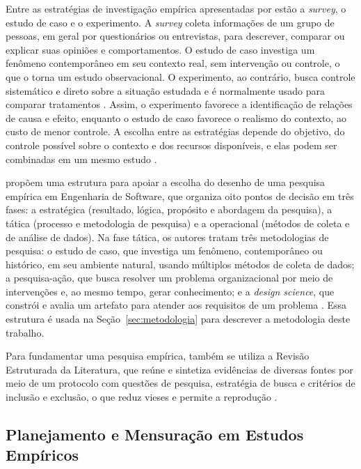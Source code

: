 Entre as estratégias de investigação empírica apresentadas por  estão a \textit{survey}, o estudo de caso e o experimento. A \textit{survey} coleta informações de um grupo de pessoas, em geral por questionários ou entrevistas, para descrever, comparar ou explicar suas opiniões e comportamentos. O estudo de caso investiga um fenômeno contemporâneo em seu contexto real, sem intervenção ou controle, o que o torna um estudo observacional. O experimento, ao contrário, busca controle sistemático e direto sobre a situação estudada e é normalmente usado para comparar tratamentos \cite{wohlin2015}. Assim, o experimento favorece a identificação de relações de causa e efeito, enquanto o estudo de caso favorece o realismo do contexto, ao custo de menor controle. A escolha entre as estratégias depende do objetivo, do controle possível sobre o contexto e dos recursos disponíveis, e elas podem ser combinadas em um mesmo estudo \cite{wohlin2015}.

 propõem uma estrutura para apoiar a escolha do desenho de uma pesquisa empírica em Engenharia de Software, que organiza oito pontos de decisão em três fases: a estratégica (resultado, lógica, propósito e abordagem da pesquisa), a tática (processo e metodologia de pesquisa) e a operacional (métodos de coleta e de análise de dados). Na fase tática, os autores tratam três metodologias de pesquisa: o estudo de caso, que investiga um fenômeno, contemporâneo ou histórico, em seu ambiente natural, usando múltiplos métodos de coleta de dados; a pesquisa-ação, que busca resolver um problema organizacional por meio de intervenções e, ao mesmo tempo, gerar conhecimento; e a \textit{design science}, que constrói e avalia um artefato para atender aos requisitos de um problema \cite{wohlin2015}. Essa estrutura é usada na Seção~\ref{sec:metodologia} para descrever a metodologia deste trabalho.

Para fundamentar uma pesquisa empírica, também se utiliza a Revisão Estruturada da Literatura, que reúne e sintetiza evidências de diversas fontes por meio de um protocolo com questões de pesquisa, estratégia de busca e critérios de inclusão e exclusão, o que reduz vieses e permite a reprodução \cite{kitchenham2007}.

\subsection{Planejamento e Mensuração em Estudos Empíricos}
\label{subsec:planejamento-mensuracao}

